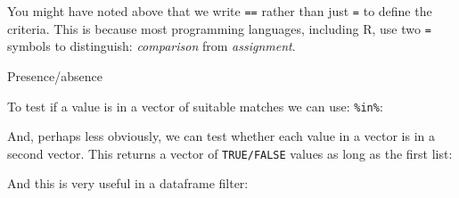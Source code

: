 \documentclass[]{article}
\newenvironment{Shaded}{\begin{snugshade}}{\end{snugshade}}
\newcommand{\KeywordTok}[1]{\textcolor[rgb]{0.13,0.29,0.53}{\textbf{#1}}}
\newcommand{\DecValTok}[1]{\textcolor[rgb]{0.00,0.00,0.81}{#1}}
\newcommand{\StringTok}[1]{\textcolor[rgb]{0.31,0.60,0.02}{#1}}
\newcommand{\OperatorTok}[1]{\textcolor[rgb]{0.81,0.36,0.00}{\textbf{#1}}}
\newcommand{\NormalTok}[1]{#1}
\theoremstyle{definition}
\theoremstyle{definition}
\theoremstyle{definition}
\theoremstyle{remark}
\begin{document}
You might have noted above that we write \texttt{==} rather than just
\texttt{=} to define the criteria. This is because most programming
languages, including R, use two \texttt{=} symbols to distinguish:
\emph{comparison} from \emph{assignment}.

Presence/absence

To test if a value is in a vector of suitable matches we can use:
\texttt{\%in\%}:

\begin{Shaded}
\end{Shaded}

And, perhaps less obviously, we can test whether each value in a vector
is in a second vector. This returns a vector of \texttt{TRUE/FALSE}
values as long as the first list:

\begin{Shaded}
\end{Shaded}

And this is very useful in a dataframe filter:

\begin{Shaded}
\end{Shaded}
\end{document}
